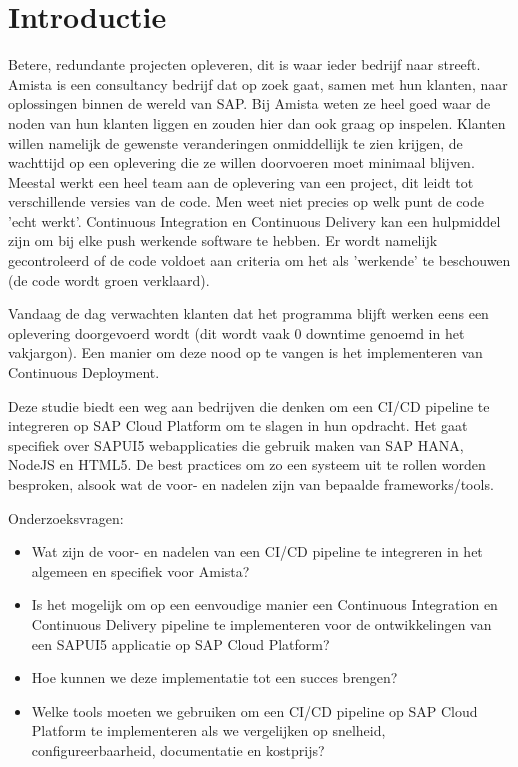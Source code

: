 
\section{Introductie} %
\label{sec:introductie}
Betere, redundante projecten opleveren, dit is waar ieder bedrijf naar streeft.
Amista is een consultancy bedrijf dat op zoek gaat, samen met hun klanten, naar oplossingen binnen de wereld van SAP.
Bij Amista weten ze heel goed waar de noden van hun klanten liggen en zouden hier dan ook graag op inspelen.
Klanten willen namelijk de gewenste veranderingen onmiddellijk te zien krijgen, de wachttijd op een oplevering die ze willen doorvoeren moet minimaal blijven.
Meestal werkt een heel team aan de oplevering van een project, dit leidt tot verschillende versies van de code.
Men weet niet precies op welk punt de code 'echt werkt'. 
Continuous Integration en Continuous Delivery kan een hulpmiddel zijn om bij elke push werkende software te hebben. Er wordt namelijk gecontroleerd of de code voldoet aan criteria om het als 'werkende' te beschouwen (de code wordt groen verklaard).

Vandaag de dag verwachten klanten dat het programma blijft werken eens een oplevering doorgevoerd wordt (dit wordt vaak 0 downtime genoemd in het vakjargon).
Een manier om deze nood op te vangen is het implementeren van Continuous Deployment.

Deze studie biedt een weg aan bedrijven die denken om een CI/CD pipeline te integreren op SAP Cloud Platform om te slagen in hun opdracht. Het gaat specifiek over SAPUI5 webapplicaties die gebruik maken van SAP HANA, NodeJS en HTML5. 
De best practices om zo een systeem uit te rollen worden besproken, alsook wat de voor- en nadelen zijn van bepaalde frameworks/tools.

Onderzoeksvragen:
\begin{itemize}
    \item Wat zijn de voor- en nadelen van een CI/CD pipeline te integreren in het algemeen en specifiek voor Amista?
    \item Is het mogelijk om op een eenvoudige manier een Continuous Integration en Continuous Delivery pipeline te implementeren voor de ontwikkelingen van een SAPUI5 applicatie op SAP Cloud Platform?
    \item Hoe kunnen we deze implementatie tot een succes brengen?
    \item Welke tools moeten we gebruiken om een CI/CD pipeline op SAP Cloud Platform te implementeren als we vergelijken op snelheid, configureerbaarheid, documentatie en kostprijs?
\end{itemize}


